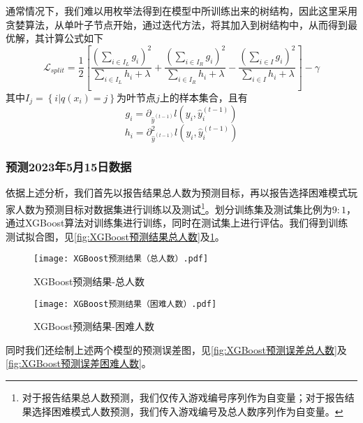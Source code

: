\documentclass{MathModeling}
\begin{document}
		通常情况下，我们难以用枚举法得到在模型中所训练出来的树结构，因此这里采用贪婪算法，从单叶子节点开始，通过迭代方法，将其加入到树结构中，从而得到最优解，其计算公式\textcolor{blue}{\cite{pxgboost3}}如下
		\begin{equation}
			\mathcal{L}_{split}=\frac{1}{2}\left[\frac{\left(\sum_{i\in I_L}g_i\right)^2}{\sum_{i\in I_L}h_i+\lambda}+\frac{\left(\sum_{i\in I_R}g_i\right)^2}{\sum_{i\in I_R}h_i+\lambda}-\frac{\left(\sum_{i\in I}g_i\right)^2}{\sum_{i\in I}h_i+\lambda}\right]-\gamma \label{fXGBoostLsplit}
		\end{equation}
		其中$I_j=\left\{i|q\left(x_i\right)=j\right\}$为叶节点$j$上的样本集合\textcolor{blue}{\cite{pxgboost2}}，且有
		\begin{equation}
			g_i=\partial_{\hat{y}^{\left(t-1\right)}}l\left(y_i,\hat{y}_i^{\left(t-1\right)}\right)
		\end{equation}
		\begin{equation}
			h_i=\partial_{\hat{y}^{\left(t-1\right)}}^2l\left(y_i,\hat{y}_i^{\left(t-1\right)}\right)
		\end{equation}

	\subsubsection{预测2023年5月15日数据}
	依据上述分析，我们首先以报告结果总人数为预测目标，再以报告选择困难模式玩家人数为预测目标对数据集进行训练以及测试\textcolor{blue}{\footnote{对于报告结果总人数预测，我们仅传入游戏编号序列作为自变量；对于报告结果选择困难模式人数预测，我们传入游戏编号及总人数序列作为自变量。}}。划分训练集及测试集比例为$9:1$，通过XGBoost算法对训练集进行训练，同时在测试集上进行评估。我们得到训练测试拟合图，见\textcolor{blue}{\cref{fig:XGBoost预测结果总人数}}及\textcolor{blue}{\cref{fig:XGBoost预测结果困难人数}}。

	\begin{figure}[H]
		\centering
		\begin{minipage}{0.48\linewidth}
			\centering
			\texttt{[image: XGBoost预测结果（总人数）.pdf]}
			\caption{XGBoost预测结果-总人数}
			\label{fig:XGBoost预测结果总人数}
		\end{minipage}
		\begin{minipage}{0.48\linewidth}
			\centering
			\texttt{[image: XGBoost预测结果（困难人数）.pdf]}
			\caption{XGBoost预测结果-困难人数}
			\label{fig:XGBoost预测结果困难人数}
		\end{minipage}
	\end{figure}
	同时我们还绘制上述两个模型的预测误差图，见\textcolor{blue}{\cref{fig:XGBoost预测误差总人数}}及\textcolor{blue}{\cref{fig:XGBoost预测误差困难人数}}。
\end{document}

